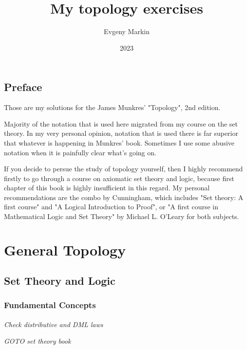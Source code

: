 \documentclass[11pt,oneside,titlepage]{book}
\title{My topology exercises}
\author{Evgeny Markin}
\date{2023}
\begin{document}
\maketitle
\tableofcontents

\chapter*{Preface}

Those are my solutions for the James Munkres' "Topology", 2nd edition.

Majority of the notation that is used here migrated from my course on the set theory. In
my very personal opinion, notation that is used there is far superior that whatever is
happening in Munkres' book. Sometimes I use some abusive notation when it is painfully
clear what's going on.

If you decide to persue the study of topology yourself, then I highly recommend firstly
to go through a course on axiomatic set theory and logic, because first chapter of this
book is highly insufficient in this regard. My personal recommendations are the
combo by Cunningham, which includes "Set theory: A first course" and
"A Logical Introduction to Proof", or 
"A first course in Mathematical Logic and Set Theory" by Michael L. O’Leary for both subjects.

\part{General Topology}

\chapter{Set Theory and Logic}


\section{Fundamental Concepts}

\subsection{}

\textit{Check distributive and DML laws}

\textit{GOTO set theory book}

\subsection{}
\end{document}
